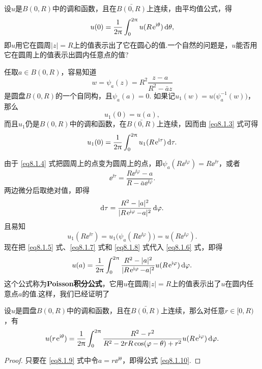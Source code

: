 设$u$是$B(0,R)$中的调和函数，且在$\bar{B(0,R)}$上连续，由平均值公式，得
\begin{equation}\label{eq8.1.3}
  u(0) = \frac1{2\uppi}\int_0^{2\uppi}u(R\operatorname{\!\!\;\mathrm e}^{\mathrm i\theta})\mathop{}\!\mathrm{d} \theta,
\end{equation}
即$u$用它在圆周$|z|=R$上的值表示出了它在圆心的值.一个自然的问题是，$u$能否用它在圆周上的值表示出圆内任意点的值?

任取$a\in B(0,R)$，容易知道
\begin{equation}\label{eq8.1.4}
  w = \psi_a(z) = R^2\frac{z-a}{R^2-\bar az}
\end{equation}
是圆盘$B(0,R)$的一个自同构，且$\psi_a(a)=0$. 如果记$u_1(w)=u\big(\psi_a^{-1}(w)\big)$，那么
\begin{equation}\label{eq8.1.5}
  u_1(0) = u(a),
\end{equation}
而且$u_1$仍是$B(0,R)$中的调和函数，在$\bar{B(0,R)}$上连续，因而由 \eqref{eq8.1.3} 式可得
\begin{equation}\label{eq8.1.6}
  u_1(0) = \frac1{2\uppi}\int_0^{2\uppi}u_1(R\operatorname{\!\!\;\mathrm e}^{\mathrm i\tau})\mathop{}\!\mathrm{d} \tau.
\end{equation}

由于 \eqref{eq8.1.4} 式把圆周上的点变为圆周上的点，即$\psi_a(R\ee^{\ii\varphi})=R\ee^{\ii\tau}$，或者
\[
  \ee^{\ii\tau} = \frac{R\ee^{\ii\varphi}-a}{R-\bar a\ee^{\ii\varphi}}.
\]
两边微分后取绝对值，即得
\begin{equation}\label{eq8.1.7}
  \mathop{}\!\mathrm{d} \tau = \frac{R^2-|a|^2}{|R\operatorname{\!\!\;\mathrm e}^{\mathrm i\varphi}-a|^2}\mathop{}\!\mathrm{d} \varphi.
\end{equation}
且易知
\begin{equation}\label{eq8.1.8}
  u_1(R\ee^{\ii\tau}) = u_1\big(\psi_a(R\ee^{\ii\varphi})\big) = u(R\ee^{\ii\varphi}).
\end{equation}
现在把 \eqref{eq8.1.5} 式、\eqref{eq8.1.7} 式和 \eqref{eq8.1.8} 式代入 \eqref{eq8.1.6} 式，即得
\begin{equation}\label{eq8.1.9}
   u(a) = \frac1{2\uppi}\int_0^{2\uppi}\frac{R^2-|a|^2}{|R\operatorname{\!\!\;\mathrm e}^{\mathrm i\varphi}-a|^2}
  u(R\operatorname{\!\!\;\mathrm e}^{\mathrm i\varphi})\mathop{}\!\mathrm{d} \varphi.
\end{equation}
这个公式称为\textbf{Poisson积分公式}，它用$u$在圆周$|z|=R$上的值表示出了$u$在圆内任意点$a$的值.这样，我们已经证明了
\begin{theorem}\label{thm8.1.5}
  设$u$是圆盘$B(0,R)$中的调和函数，且在$\bar{B(0,R)}$上连续，那么对任意$r\in[0,R)$，有
  \begin{equation}\label{eq8.1.10}
    u(r\operatorname{\!\!\;\mathrm e}^{\mathrm i\theta}) = \frac1{2\uppi}\int_0^{2\uppi}
    \frac{R^2-r^2}{R^2-2rR\cos(\varphi-\theta)+r^2}u(R\operatorname{\!\!\;\mathrm e}^{\mathrm i\varphi})\mathop{}\!\mathrm{d} \varphi.
  \end{equation}
\end{theorem}
\begin{proof}
  只要在 \eqref{eq8.1.9} 式中令$a=r\ee^{\ii\theta}$，即得公式 \eqref{eq8.1.10}.
\end{proof}

